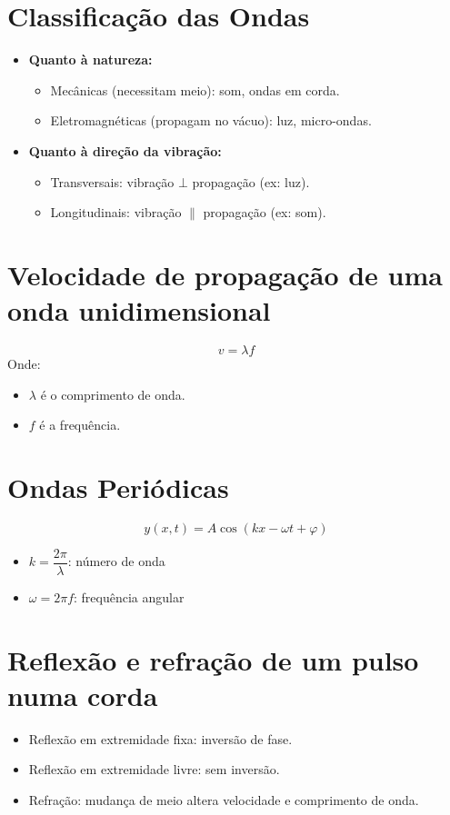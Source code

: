 \documentclass[a4paper,12pt]{article}
\begin{document}
\begin{multicols}{2}
\section{Classificação das Ondas}
\begin{itemize}
    \item \textbf{Quanto à natureza:}
    \begin{itemize}
        \item Mecânicas (necessitam meio): som, ondas em corda.
        \item Eletromagnéticas (propagam no vácuo): luz, micro-ondas.
    \end{itemize}
    \item \textbf{Quanto à direção da vibração:}
    \begin{itemize}
        \item Transversais: vibração $\bot$ propagação (ex: luz).
        \item Longitudinais: vibração $\|$ propagação (ex: som).
    \end{itemize}
\end{itemize}

\section{Velocidade de propagação de uma onda unidimensional}
\[
    v = \lambda f
\]
Onde:
\begin{itemize}
    \item $\lambda$ é o comprimento de onda.
    \item $f$ é a frequência.
\end{itemize}

\section{Ondas Periódicas}
\[
    y(x, t) = A \cos(kx - \omega t + \varphi)
\]
\begin{itemize}
    \item $k = \dfrac{2\pi}{\lambda}$: número de onda
    \item $\omega = 2\pi f $: frequência angular
\end{itemize}

\section{Reflexão e refração de um pulso numa corda}
\begin{itemize}
    \item Reflexão em extremidade fixa: inversão de fase.
    \item Reflexão em extremidade livre: sem inversão.
    \item Refração: mudança de meio altera velocidade e comprimento de onda.
\end{itemize}


\end{multicols}
\end{document}
